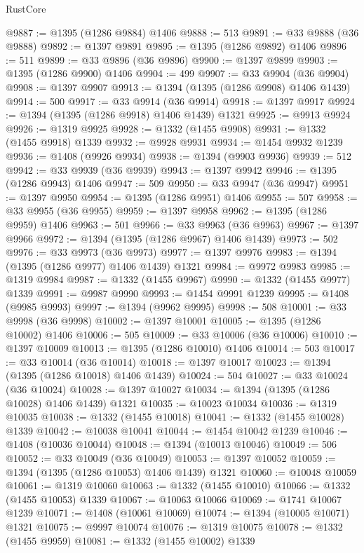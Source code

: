 \begin{lexlean}{RustCore}
\begin{coremodule}
@9887 := @1395 (@1286 @9884) @1406
@9888 := 513
@9891 := @33 @9888 (@36 @9888)
@9892 := @1397 @9891
@9895 := @1395 (@1286 @9892) @1406
@9896 := 511
@9899 := @33 @9896 (@36 @9896)
@9900 := @1397 @9899
@9903 := @1395 (@1286 @9900) @1406
@9904 := 499
@9907 := @33 @9904 (@36 @9904)
@9908 := @1397 @9907
@9913 := @1394 (@1395 (@1286 @9908) @1406 @1439)
@9914 := 500
@9917 := @33 @9914 (@36 @9914)
@9918 := @1397 @9917
@9924 := @1394 (@1395 (@1286 @9918) @1406 @1439) @1321
@9925 := @9913 @9924
@9926 := @1319 @9925
@9928 := @1332 (@1455 @9908)
@9931 := @1332 (@1455 @9918) @1339
@9932 := @9928 @9931
@9934 := @1454 @9932 @1239
@9936 := @1408 (@9926 @9934)
@9938 := @1394 (@9903 @9936)
@9939 := 512
@9942 := @33 @9939 (@36 @9939)
@9943 := @1397 @9942
@9946 := @1395 (@1286 @9943) @1406
@9947 := 509
@9950 := @33 @9947 (@36 @9947)
@9951 := @1397 @9950
@9954 := @1395 (@1286 @9951) @1406
@9955 := 507
@9958 := @33 @9955 (@36 @9955)
@9959 := @1397 @9958
@9962 := @1395 (@1286 @9959) @1406
@9963 := 501
@9966 := @33 @9963 (@36 @9963)
@9967 := @1397 @9966
@9972 := @1394 (@1395 (@1286 @9967) @1406 @1439)
@9973 := 502
@9976 := @33 @9973 (@36 @9973)
@9977 := @1397 @9976
@9983 := @1394 (@1395 (@1286 @9977) @1406 @1439) @1321
@9984 := @9972 @9983
@9985 := @1319 @9984
@9987 := @1332 (@1455 @9967)
@9990 := @1332 (@1455 @9977) @1339
@9991 := @9987 @9990
@9993 := @1454 @9991 @1239
@9995 := @1408 (@9985 @9993)
@9997 := @1394 (@9962 @9995)
@9998 := 508
@10001 := @33 @9998 (@36 @9998)
@10002 := @1397 @10001
@10005 := @1395 (@1286 @10002) @1406
@10006 := 505
@10009 := @33 @10006 (@36 @10006)
@10010 := @1397 @10009
@10013 := @1395 (@1286 @10010) @1406
@10014 := 503
@10017 := @33 @10014 (@36 @10014)
@10018 := @1397 @10017
@10023 := @1394 (@1395 (@1286 @10018) @1406 @1439)
@10024 := 504
@10027 := @33 @10024 (@36 @10024)
@10028 := @1397 @10027
@10034 := @1394 (@1395 (@1286 @10028) @1406 @1439) @1321
@10035 := @10023 @10034
@10036 := @1319 @10035
@10038 := @1332 (@1455 @10018)
@10041 := @1332 (@1455 @10028) @1339
@10042 := @10038 @10041
@10044 := @1454 @10042 @1239
@10046 := @1408 (@10036 @10044)
@10048 := @1394 (@10013 @10046)
@10049 := 506
@10052 := @33 @10049 (@36 @10049)
@10053 := @1397 @10052
@10059 := @1394 (@1395 (@1286 @10053) @1406 @1439) @1321
@10060 := @10048 @10059
@10061 := @1319 @10060
@10063 := @1332 (@1455 @10010)
@10066 := @1332 (@1455 @10053) @1339
@10067 := @10063 @10066
@10069 := @1741 @10067 @1239
@10071 := @1408 (@10061 @10069)
@10074 := @1394 (@10005 @10071) @1321
@10075 := @9997 @10074
@10076 := @1319 @10075
@10078 := @1332 (@1455 @9959)
@10081 := @1332 (@1455 @10002) @1339

\end{coremodule}
\end{lexlean}
